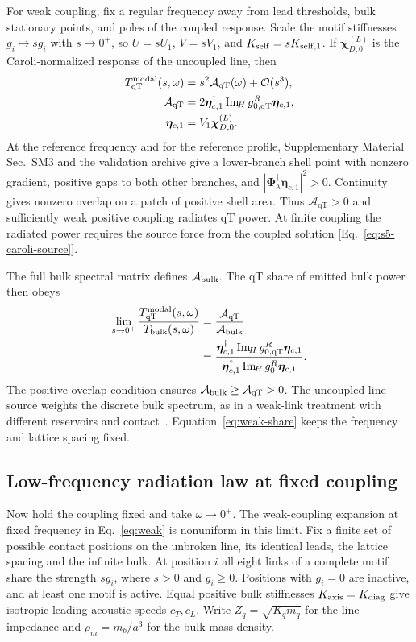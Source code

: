 \documentclass[10pt,aps,onecolumn,floatfix,notitlepage,nofootinbib,showkeys]{revtex4-2}
\newcommand{\vchi}{\bm{\chi}}
\newcommand{\veta}{\bm{\eta}}
\newcommand{\order}{\mathcal O}
\newcommand{\qT}{\mathrm{qT}}
\newcommand{\ImH}{\operatorname{Im}_{\!H}}
\begin{document}
For weak coupling, fix a regular frequency away from lead thresholds, bulk stationary points, and poles of the coupled response. Scale the motif stiffnesses $g_i\mapsto s g_i$ with $s\to0^+$, so $U=sU_1$, $V=sV_1$, and $K_{\rm self}=sK_{{\rm self},1}$. If $\vchi_{D,0}^{(L)}$ is the Caroli-normalized response of the uncoupled line, then
\begin{align}
 T_{\qT}^{\rm modal}(s,\omega)
 &=s^2\mathcal A_{\qT}(\omega)+\order(s^3),
 \label{eq:weak}\\
 \mathcal A_{\qT}
 &=2\veta_{c,1}^\dagger\ImH g_{0,\qT}^R\veta_{c,1},\\
 \veta_{c,1}&=V_1\vchi_{D,0}^{(L)}.
\end{align}
At the reference frequency and for the reference profile, Supplementary Material Sec.~SM3 and the validation archive give a lower-branch shell point with nonzero gradient, positive gaps to both other branches, and $|\bm\Phi_\lambda^\dagger\veta_{c,1}|^2>0$. Continuity gives nonzero overlap on a patch of positive shell area. Thus $\mathcal A_{\qT}>0$ and sufficiently weak positive coupling radiates qT power. At finite coupling the radiated power requires the source force from the coupled solution [Eq.~\eqref{eq:s5-caroli-source}].

The full bulk spectral matrix defines $\mathcal A_{\rm bulk}$. The qT share of emitted bulk power then obeys
\begin{equation}
\begin{aligned}
 \lim_{s\to0^+}\frac{T_{\qT}^{\rm modal}(s,\omega)}{T_{\rm bulk}(s,\omega)}
 &=\frac{\mathcal A_{\qT}}{\mathcal A_{\rm bulk}}\\
 &=\frac{\veta_{c,1}^{\dagger}\ImH g_{0,\qT}^R\veta_{c,1}}
 {\veta_{c,1}^{\dagger}\ImH g_0^R\veta_{c,1}}.
\end{aligned}
\label{eq:weak-share}
\end{equation}
The positive-overlap condition ensures $\mathcal A_{\rm bulk}\geq\mathcal A_{\qT}>0$. The uncoupled line source weights the discrete bulk spectrum, as in a weak-link treatment with different reservoirs and contact~\cite{PattonGeller2001}. Equation~\eqref{eq:weak-share} keeps the frequency and lattice spacing fixed.

\subsection{Low-frequency radiation law at fixed coupling}
\label{pred:sec-lowfreq}

Now hold the coupling fixed and take $\omega\to0^+$. The weak-coupling expansion at fixed frequency in Eq.~\eqref{eq:weak} is nonuniform in this limit. Fix a finite set of possible contact positions on the unbroken line, its identical leads, the lattice spacing and the infinite bulk. At position $i$ all eight links of a complete motif share the strength $s g_i$, where $s>0$ and $g_i\geq0$. Positions with $g_i=0$ are inactive, and at least one motif is active. Equal positive bulk stiffnesses $K_{\rm axis}=K_{\rm diag}$ give isotropic leading acoustic speeds $c_T,c_L$. Write $Z_q=\sqrt{K_qm_q}$ for the line impedance and $\rho_m=m_b/a^3$ for the bulk mass density.
\end{document}
